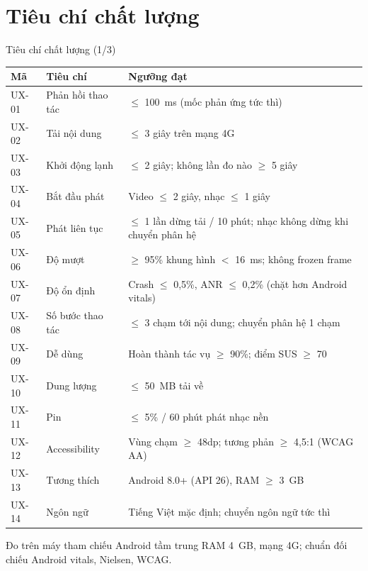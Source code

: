 \documentclass[aspectratio=169]{beamer}
\begin{document}
\section{Tiêu chí chất lượng}
\begin{frame}{Tiêu chí chất lượng (1/3)}
  \begin{center}\tiny
  \begin{tabular}{@{}p{1.0cm}p{3.1cm}p{7.6cm}@{}}
    \toprule
    \textbf{Mã} & \textbf{Tiêu chí} & \textbf{Ngưỡng đạt} \\
    \midrule
    UX-01 & Phản hồi thao tác & $\leq$ 100~ms (mốc phản ứng tức thì) \\
    UX-02 & Tải nội dung & $\leq$ 3 giây trên mạng 4G \\
    UX-03 & Khởi động lạnh & $\leq$ 2 giây; không lần đo nào $\geq$ 5 giây \\
    UX-04 & Bắt đầu phát & Video $\leq$ 2 giây, nhạc $\leq$ 1 giây \\
    UX-05 & Phát liên tục & $\leq$ 1 lần dừng tải / 10 phút; nhạc không dừng khi chuyển phân hệ \\
    UX-06 & Độ mượt & $\geq$ 95\% khung hình $<$ 16~ms; không frozen frame \\
    UX-07 & Độ ổn định & Crash $\leq$ 0,5\%, ANR $\leq$ 0,2\% (chặt hơn Android vitals) \\
    UX-08 & Số bước thao tác & $\leq$ 3 chạm tới nội dung; chuyển phân hệ 1 chạm \\
    UX-09 & Dễ dùng & Hoàn thành tác vụ $\geq$ 90\%; điểm SUS $\geq$ 70 \\
    UX-10 & Dung lượng & $\leq$ 50~MB tải về \\
    UX-11 & Pin & $\leq$ 5\% / 60 phút phát nhạc nền \\
    UX-12 & Accessibility & Vùng chạm $\geq$ 48dp; tương phản $\geq$ 4,5:1 (WCAG AA) \\
    UX-13 & Tương thích & Android 8.0+ (API 26), RAM $\geq$ 3~GB \\
    UX-14 & Ngôn ngữ & Tiếng Việt mặc định; chuyển ngôn ngữ tức thì \\
    \bottomrule
  \end{tabular}
  \end{center}
  \vfill
  {\tiny\color{brandgray} Đo trên máy tham chiếu Android tầm trung RAM 4~GB, mạng 4G; chuẩn đối chiếu Android vitals, Nielsen, WCAG.}
\end{frame}
\end{document}
